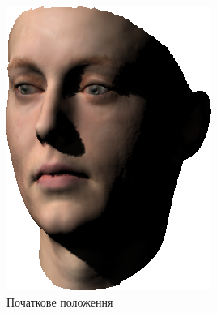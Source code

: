 \begin{figure}[h]
  \centering
  \begin{subfigure}[b]{0.4\textwidth}
    \centering
    \includegraphics[width=\textwidth]{images/face_shaded_1}
    \caption{Початкове положення}
  \end{subfigure}
  \begin{subfigure}[b]{0.4\textwidth}
    \centering

\end{subfigure}
\end{figure}
